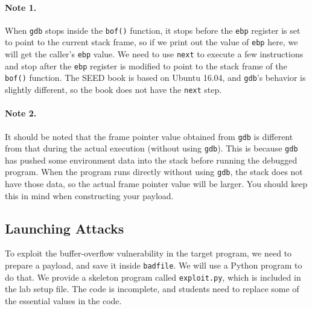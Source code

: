 \paragraph{Note 1.} When \texttt{gdb} stops inside the \texttt{bof()} function, it 
stops before the \texttt{ebp} register is set
to point to the current stack frame, so if we print out the value of 
\texttt{ebp} here, we will get the caller's \texttt{ebp} value. We need to use 
\texttt{next} to execute a few instructions and stop 
after the \texttt{ebp} register is modified to point to the stack
frame of the \texttt{bof()} function. 
The SEED book is based on Ubuntu 16.04, and \texttt{gdb}'s behavior is slightly
different, so the book does not have the \texttt{next} step. 

\paragraph{Note 2.}
It should be noted that the frame pointer value
obtained from \texttt{gdb} is different from that during the actual
execution (without using \texttt{gdb}). This is because \texttt{gdb}  
has pushed some environment data into the stack before running the debugged program. 
When the program runs directly without using \texttt{gdb},
the stack does not have those data, so the actual frame pointer value 
will be larger. You should keep this in mind when constructing 
your payload. 


\subsection{Launching Attacks} 

To exploit the buffer-overflow vulnerability in the target program,
we need to prepare a payload, and save it inside \texttt{badfile}. 
We will use a Python program to do that.
We provide a skeleton program called \texttt{exploit.py}, which
is included in the lab setup file.
The code is incomplete, and students need to replace some of the essential
values in the code.


\newcommand{\needtochange}{\ding{73} Need to change \ding{73}}


